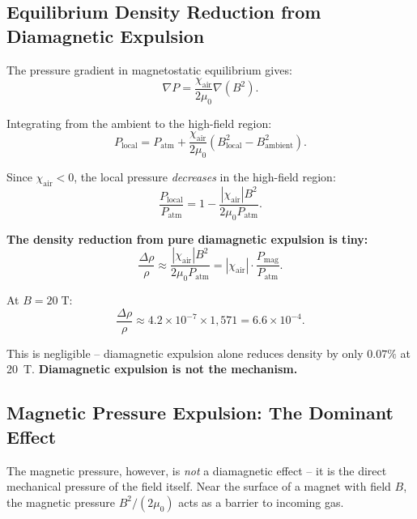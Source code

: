 \documentclass[11pt,a4paper]{article}
\begin{document}
\subsection{Equilibrium Density Reduction from Diamagnetic Expulsion}

The pressure gradient in magnetostatic equilibrium gives:
\begin{equation}
\nabla P = \frac{\chi_{\mathrm{air}}}{2\mu_0} \nabla(B^2).
\end{equation}

Integrating from the ambient to the high-field region:
\begin{equation}
P_{\mathrm{local}} = P_{\mathrm{atm}} + \frac{\chi_{\mathrm{air}}}{2\mu_0}(B_{\mathrm{local}}^2 - B_{\mathrm{ambient}}^2).
\end{equation}

Since $\chi_{\mathrm{air}} < 0$, the local pressure \emph{decreases} in the
high-field region:
\begin{equation}
\frac{P_{\mathrm{local}}}{P_{\mathrm{atm}}} = 1 - \frac{|\chi_{\mathrm{air}}|B^2}{2\mu_0 P_{\mathrm{atm}}}.
\end{equation}

\textbf{The density reduction from pure diamagnetic expulsion is tiny:}
\begin{equation}
\frac{\Delta\rho}{\rho} \approx \frac{|\chi_{\mathrm{air}}|B^2}{2\mu_0 P_{\mathrm{atm}}}
= |\chi_{\mathrm{air}}| \cdot \frac{P_{\mathrm{mag}}}{P_{\mathrm{atm}}}.
\end{equation}

At $B = 20\;\mathrm{T}$:
\begin{equation}
\frac{\Delta\rho}{\rho} \approx 4.2 \times 10^{-7} \times 1{,}571 = 6.6 \times 10^{-4}.
\end{equation}

This is negligible -- diamagnetic expulsion alone reduces density by only $0.07\%$
at 20~T. \textbf{Diamagnetic expulsion is not the mechanism.}

\subsection{Magnetic Pressure Expulsion: The Dominant Effect}

The magnetic pressure, however, is \emph{not} a diamagnetic effect -- it is the
direct mechanical pressure of the field itself. Near the surface of a magnet with
field $B$, the magnetic pressure $B^2/(2\mu_0)$ acts as a barrier to incoming gas.
\end{document}
